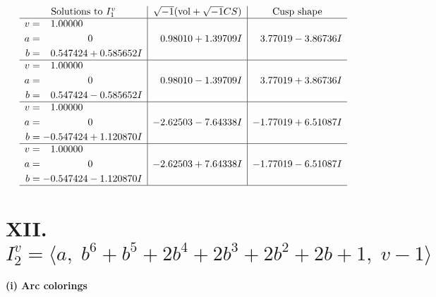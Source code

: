 \documentclass[1p]{elsarticle_modified}
\theoremstyle{definition}
\newcommand{\I}{\sqrt{-1}}
\begin{document}
$$\begin{array}{c|c|c}  
\text{Solutions to }I^v_{1}& \I (\text{vol} + \sqrt{-1}CS) & \text{Cusp shape}\\
 \hline 
\begin{aligned}
v &= \phantom{-}1.00000\phantom{ +0.000000I} \\
a &= \phantom{-0.000000 } 0 \\
b &= \phantom{-}0.547424 + 0.585652 I\end{aligned}
 & \phantom{-}0.98010 + 1.39709 I & \phantom{-}3.77019 - 3.86736 I \\ \hline\begin{aligned}
v &= \phantom{-}1.00000\phantom{ +0.000000I} \\
a &= \phantom{-0.000000 } 0 \\
b &= \phantom{-}0.547424 - 0.585652 I\end{aligned}
 & \phantom{-}0.98010 - 1.39709 I & \phantom{-}3.77019 + 3.86736 I \\ \hline\begin{aligned}
v &= \phantom{-}1.00000\phantom{ +0.000000I} \\
a &= \phantom{-0.000000 } 0 \\
b &= -0.547424 + 1.120870 I\end{aligned}
 & -2.62503 - 7.64338 I & -1.77019 + 6.51087 I \\ \hline\begin{aligned}
v &= \phantom{-}1.00000\phantom{ +0.000000I} \\
a &= \phantom{-0.000000 } 0 \\
b &= -0.547424 - 1.120870 I\end{aligned}
 & -2.62503 + 7.64338 I & -1.77019 - 6.51087 I\\
 \hline 
 \end{array}$$\newpage\newpage\renewcommand{\arraystretch}{1}
\centering \section*{XII. $I^v_{2}= \langle a,\;b^6+b^5+2 b^4+2 b^3+2 b^2+2 b+1,\;v-1 \rangle$}
\flushleft \textbf{(i) Arc colorings}\\
\end{document}
